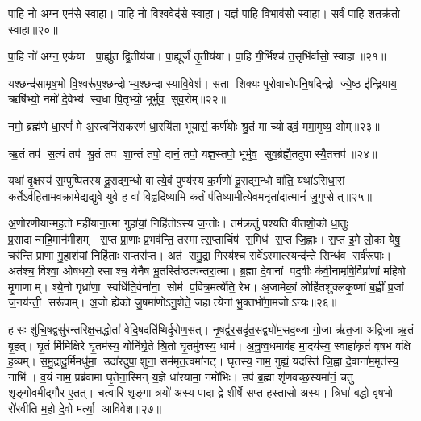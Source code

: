 पाहि नो अग्न एन॑से स्वा॒हा। पाहि नो विश्ववेद॑से स्वा॒हा। यज्ञं पाहि विभाव॑सो स्वा॒हा। सर्वं पाहि शतक्र॑तो स्वा॒हा॥२०॥
\anuvakamend

पा॒हि नो॑ अग्न॒ एक॑या। पा॒ह्यु॑त द्वि॒तीय॑या। पा॒ह्यूर्जं॑ तृ॒तीय॑या। पा॒हि गी॒र्भिश्च॑ त॒सृभि॑र्वासो॒ स्वाहा॥२१॥
\anuvakamend


यश्छन्द॑सामृष॒भो वि॒श्वरू॑प॒श्छन्दोभ्य॒श्छन्दास्यावि॒वेश॑। सता शिक्यः पुरोवाचो॑पनि॒षदिन्द्रो ज्ये॒ष्ठ इ॑न्द्रि॒याय॒ ऋषि॑भ्यो॒ नमो॑ दे॒वेभ्य॑ स्व॒धा पि॒तृभ्यो॒ भूर्भुव॒ सुव॒रोम्॥२२॥
\anuvakamend


नमो॒ ब्रह्म॑णे धा॒रणं॑ मे अ॒स्त्वनि॑राकरणं धा॒रयि॑ता भूयासं॒ कर्ण॑योः श्रु॒तं मा च्योढ्वं॒ ममा॒मुष्य॒ ओम्॥२३॥
\anuvakamend

ऋ॒तं तप॑ स॒त्यं तप॑ श्रु॒तं तप॑ शा॒न्तं तपो॒ दानं॒ तपो॒ यज्ञ॒स्तपो॒ भूर्भुव॒ सुव॒र्ब्रह्मै॒तदुपास्यै॒तत्तप॑॥२४॥
\anuvakamend


यथा॑ वृ॒क्षस्य॑ स॒म्पुष्पि॑तस्य दू॒राद्ग॒न्धो वात्ये॒वं पुण्य॑स्य क॒र्मणो॑ दू॒राद्ग॒न्धो वा॑ति॒ यथा॑ऽसिधा॒रां क॒र्तेऽव॑हितामव॒क्रामे॒द्यद्युवे॒ युवे॒ ह वा॑ वि॒ह्वदि॑ष्यामि क॒र्तं प॑तिष्या॒मीत्ये॒वम॒नृता॑दा॒त्मानं॑ जु॒गुप्सेत्॥२५॥
\anuvakamend


अ॒णोरणी॑यान्मह॒तो मही॑याना॒त्मा गुहा॑यां॒ निहि॑तोऽस्य ज॒न्तोः। तम॑क्रतुं पश्यति वीतशो॒को धा॒तुः प्र॒सादान्महि॒मान॑मीशम्। स॒प्त प्रा॒णाः प्र॒भव॑न्ति॒ तस्मात्स॒प्तार्चिष॑ स॒मिध॑ स॒प्त जि॒ह्वाः। स॒प्त इ॒मे लो॒का येषु॒ चर॑न्ति प्रा॒णा गु॒हाश॑यां॒ निहि॑ताः स॒प्तस॑प्त। अत॑ समु॒द्रा गि॒रय॑श्च॒ सर्वे॒ऽस्मात्स्यन्द॑न्ते॒ सिन्ध॑व॒ सर्व॑रूपाः। अत॑श्च॒ विश्वा॒ ओष॑धयो॒ रसाश्च॒ येनै॑ष भू॒तस्ति॑ष्ठत्यन्तरा॒त्मा। ब्र॒ह्मा दे॒वानां पद॒वीः क॑वी॒नामृषि॒र्विप्रा॑णां महि॒षो मृ॒गाणाम्। श्ये॒नो गृध्रा॑णा॒ स्वधि॑ति॒र्वना॑ना॒ सोम॑ प॒वित्र॒मत्ये॑ति॒ रेभ\sn{}। अ॒जामेकां॒ लोहि॑तशुक्लकृ॒ष्णां ब॒ह्वीं प्र॒जां ज॒नय॑न्ती॒ सरू॑पाम्। अ॒जो ह्येको॑ जु॒षमा॑णोऽनु॒शेते॒ जहात्येनां भु॒क्तभो॑गा॒मजोऽन्यः॥२६॥

ह॒सः शु॑चि॒षद्वसु॑रन्तरिक्ष॒सद्धोता॑ वेदि॒षदति॑थिर्दुरोण॒सत्। नृ॒षद्व॑र॒सदृ॑त॒सद्व्यो॑म॒सद॒ब्जा गो॒जा ऋ॑त॒जा अ॑द्रि॒जा ऋ॒तं बृ॒हत्। घृ॒तं मि॑मिक्षिरे घृ॒तम॑स्य॒ योनि॑र्घृ॒ते श्रि॒तो घृ॒तमु॑वस्य॒ धाम॑। अ॒नु॒ष्व॒धमाव॑ह मा॒दय॑स्व॒ स्वाहा॑कृतं॑ वृषभ वक्षि ह॒व्यम्। स॒मु॒द्रादू॒र्मिमधु॑मा॒ उदा॑रदुपा॒शुना॒ सम॑मृत॒त्वमा॑नट्। घृ॒तस्य॒ नाम॒ गुह्यं॒ यदस्ति॑ जि॒ह्वा दे॒वाना॑म॒मृत॑स्य॒ नाभि॑। व॒यं नाम॒ प्रब्र॑वामा घृ॒तेना॒स्मिन् य॒ज्ञे धा॑रयामा॒ नमो॑भिः। उप॑ ब्र॒ह्मा शृ॑णवच्छ॒स्यमा॑नं॒ चतु॑ शृङ्गोवमीद्गौ॒र ए॒तत्। च॒त्वारि॒ शृङ्गा॒ त्रयो॑ अस्य॒ पादा॒ द्वे शी॒र्\mbox{}षे स॒प्त हस्ता॑सो अ॒स्य। त्रिधा॑ ब॒द्धो वृ॑ष॒भो रो॑रवीति म॒हो दे॒वो मर्त्या॒ आवि॑वेश॥२७॥

